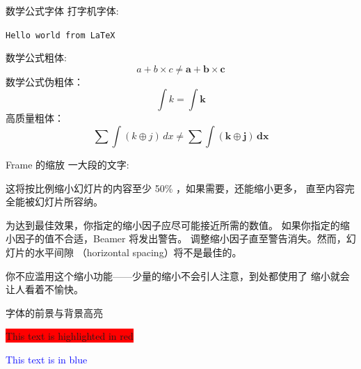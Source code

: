 \documentclass[10pt]{beamer}
\begin{document}
\begin{frame}{数学公式字体}
  打字机字体:\\
  \begin{center}
    \texttt{Hello world from \LaTeX}
  \end{center}
  数学公式粗体:
  \[
    a+b\times c \ne \boldsymbol{a+b \times c}
  \]
  数学公式伪粗体：
  \[
    \int k =  \pmb{\int k}  
  \]
  高质量粗体：
  \[
    \sum \int (k\oplus j) \,{d}x \ne
    \bm{\sum \int (k\oplus j) \,{d}x}
  \]
\end{frame}

\begin{frame}[shrink=50]{Frame 的缩放} 
  一大段的文字:\par 
  这将按比例缩小幻灯片的内容至少 50\% ，如果需要，还能缩小更多，
  直至内容完全能被幻灯片所容纳。

为达到最佳效果，你指定的缩小因子应尽可能接近所需的数值。
如果你指定的缩小因子的值不合适，Beamer 将发出警告。
调整缩小因子直至警告消失。然而，幻灯片的水平间隙
（horizontal spacing）将不是最佳的。

你不应滥用这个缩小功能——少量的缩小不会引人注意，到处都使用了
缩小就会让人看着不愉快。

\vspace*{5em}
\begin{flushleft}
  \Huge
  
  字体的前景与背景高亮\par
  
  \vspace*{2em}
  \Large
  \colorbox{red}{This text is highlighted in red}

  \textcolor{blue}{This text is in blue}
\end{flushleft}

\end{frame} 
  
  
\end{document}
